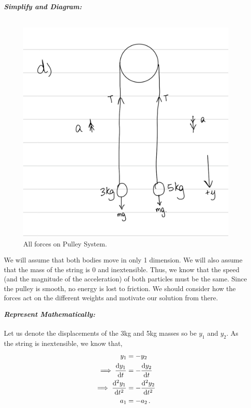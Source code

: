 \begin{subquestions}
	
	\textbf{\textit{Simplify and Diagram:}} \\ \\
	\begin{figure}[H]
		\begin{center}
			\includegraphics[scale=0.25]{../2015/figures/2015q6-4}
			\caption{\label{2015:q66:fig:Diagram4} All forces on Pulley System.}
		\end{center}
	\end{figure}
	We will assume that both bodies move in only 1 dimension. We will also assume that the mass of the string is 0 and inextensible. Thus, we know that the speed (and the magnitude of the acceleration) of both particles must be the same. Since the pulley is smooth, no energy is lost to friction. We should consider how the forces act on the different weights and motivate our solution from there.
	
	
	
	
	\textbf{\textit{Represent Mathematically:}} \\ \\ 
	Let us denote the displacements of the 3kg and 5kg masses so be $y_1$ and $y_2$. As the string is inextensible, we know that,
	\begin{align}
		y_1 & = -y_2 \nonumber \\
		\implies \frac{\mathrm{d}y_1}{\mathrm{d}t} & = -\frac{\mathrm{d}y_2}{\mathrm{d}t} \nonumber \\
		\implies \frac{\mathrm{d}^2y_1}{\mathrm{d}t^2} & = -\frac{\mathrm{d}^2y_2}{\mathrm{d}t^2} \nonumber \\
		a_1 & = -a_2 \,.
	\end{align}
	

\end{subquestions}
